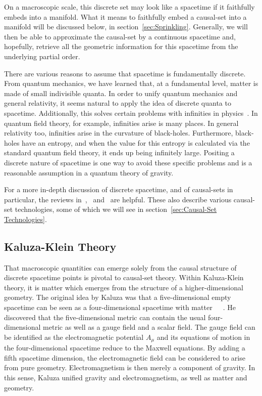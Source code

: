 \documentclass[a4paper,12pt]{article}
\numberwithin{equation}{section}
\begin{document}
On a macroscopic scale, this discrete set may look like a spacetime if it faithfully embeds into a manifold. What it means to faithfully embed a causal-set into a manifold will be discussed below, in section~\ref{sec:Sprinkling}. Generally, we will then be able to approximate the causal-set by a continuous spacetime and, hopefully, retrieve all the geometric information for this spacetime from the underlying partial order.

There are various reasons to assume that spacetime is fundamentally discrete. From quantum mechanics, we have learned that, at a fundamental level, matter is made of small indivisible quanta. In order to unify quantum mechanics and general relativity, it seems natural to apply the idea of discrete quanta to spacetime. Additionally, this solves certain problems with infinities in physics~\cite{Sorkin1990}. In quantum field theory, for example, infinities arise is many places. In general relativity too, infinities arise in the curvature of black-holes. Furthermore, black-holes have an entropy, and when the value for this entropy is calculated via the standard quantum field theory, it ends up being infinitely large. Positing a discrete nature of spacetime is one way to avoid these specific problems and is a reasonable assumption in a quantum theory of gravity.

For a more in-depth discussion of discrete spacetime, and of causal-sets in particular, the reviews in~\cite{Dowker2005},~\cite{Henson2009} and~\cite{Sorkin2003} are helpful. These also describe various causal-set technologies, some of which we will see in section~\ref{sec:Causal-Set Technologies}.
\vspace{3mm}


\subsection{Kaluza-Klein Theory}
\label{sec:Kaluza-Klein Theory}

That macroscopic quantities can emerge solely from the causal structure of discrete spacetime points is pivotal to causal-set theory. Within Kaluza-Klein theory, it is matter which emerges from the structure of a higher-dimensional geometry. The original idea by Kaluza was that a five-dimensional empty spacetime can be seen as a four-dimensional spacetime with matter~\cite{Overduin1997}~\cite{Bailin1987}~\cite{Zee2013}. He discovered that the five-dimensional metric can contain the usual four-dimensional metric as well as a gauge field and a scalar field. The gauge field can be identified as the electromagnetic potential $A_\mu$ and its equations of motion in the four-dimensional spacetime reduce to the Maxwell equations. By adding a fifth spacetime dimension, the electromagnetic field can be considered to arise from pure geometry. Electromagnetism is then merely a component of gravity. In this sense, Kaluza unified gravity and electromagnetism, as well as matter and geometry.
\end{document}
